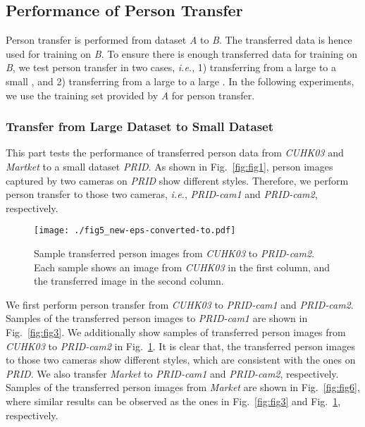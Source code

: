 \documentclass[10pt,twocolumn,letterpaper]{article}
\begin{document}
\subsection{Performance of Person Transfer}  \label{sec:exp_ptgan}
Person transfer is performed from dataset \emph{A} to \emph{B}. The transferred data is hence used for training on \emph{B}. To ensure there is enough transferred data for training on \emph{B}, we test person transfer in two cases, \emph{i.e.}, 1) transferring from a large  to a small , and 2) transferring from a large  to a large . In the following experiments, we use the training set provided by \emph{A} for person transfer.

\subsubsection{Transfer from Large Dataset to Small Dataset}
\label{sec:BigToSmall}

This part tests the performance of transferred person data from \emph{CUHK03} and \emph{Martket} to a small dataset \emph{PRID}. As shown in Fig.~\ref{fig:fig1}, person images captured by two cameras on \emph{PRID} show different styles. Therefore, we perform person transfer to those two cameras, \emph{i.e.}, \emph{PRID-cam1} and \emph{PRID-cam2}, respectively.

\begin{figure}
\begin{center}
\texttt{[image: ./fig5\_new-eps-converted-to.pdf]}
\end{center}
\caption{Sample transferred person images from \emph{CUHK03} to \emph{PRID-cam2}. Each sample shows an image from \emph{CUHK03} in the first column, and the transferred image in the second column. }
\label{fig:fig5}
\end{figure}

We first perform person transfer from \emph{CUHK03} to \emph{PRID-cam1} and \emph{PRID-cam2}. Samples of the transferred person images to \emph{PRID-cam1} are shown in Fig.~\ref{fig:fig3}. We additionally show samples of transferred person images from \emph{CUHK03} to \emph{PRID-cam2} in Fig.~\ref{fig:fig5}. It is clear that, the transferred person images to those two cameras show different styles, which are consistent with the ones on \emph{PRID}. We also transfer \emph{Market} to \emph{PRID-cam1} and \emph{PRID-cam2}, respectively. Samples of the transferred person images from \emph{Market} are shown in Fig.~\ref{fig:fig6}, where similar results can be observed as the ones in Fig.~\ref{fig:fig3} and Fig.~\ref{fig:fig5}, respectively.
\end{document}
